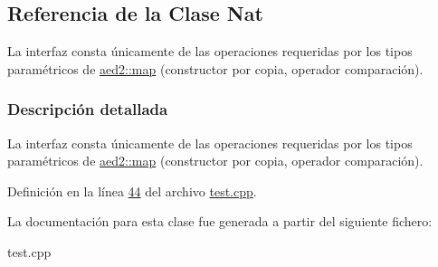 \hypertarget{classNat}{\subsection{\-Referencia de la \-Clase \-Nat}
\label{classNat}
}


\-La interfaz consta únicamente de las operaciones requeridas por los tipos paramétricos de \hyperlink{classaed2_1_1map}{aed2\-::map} (constructor por copia, operador comparación).  




\subsubsection{\-Descripción detallada}
\-La interfaz consta únicamente de las operaciones requeridas por los tipos paramétricos de \hyperlink{classaed2_1_1map}{aed2\-::map} (constructor por copia, operador comparación). 

\-Definición en la línea \hyperlink{test_8cpp_source_l00044}{44} del archivo \hyperlink{test_8cpp_source}{test.\-cpp}.



\-La documentación para esta clase fue generada a partir del siguiente fichero\-:\begin{DoxyCompactItemize}
\item 
test.\-cpp\end{DoxyCompactItemize}
